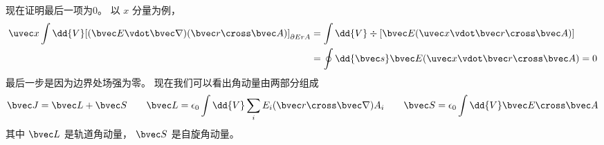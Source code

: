 现在证明最后一项为0。 以 $x$ 分量为例，
\begin{equation}
\begin{aligned}
\uvec x \int \dd{V} [(\bvec E \vdot \bvec\nabla )(\bvec r \cross \bvec A)]_{\partial ErA}  &= \int \dd{V} \div [\bvec E(\uvec x \vdot \bvec r \cross \bvec A) ] \\
&= \oint \dd{\bvec s} \bvec E(\uvec x \vdot \bvec r \cross \bvec A)  = 0
\end{aligned}
\end{equation}
最后一步是因为边界处场强为零。 现在我们可以看出角动量由两部分组成
\begin{equation}
\bvec J = \bvec L + \bvec S \qquad
\bvec L = \epsilon_0 \int \dd{V} \sum_i E_i (\bvec r \cross \bvec\nabla ) A_i \qquad
\bvec S = \epsilon_0 \int \dd{V} \bvec E \cross \bvec A
\end{equation}
其中 $\bvec L$ 是轨道角动量， $\bvec S$ 是自旋角动量。
